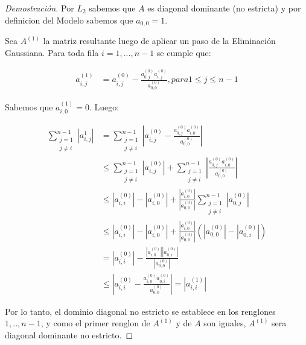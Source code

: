 \begin{proof}[Demostración]

Por $L_{2}$ sabemos que $A$ es diagonal dominante (no estricta) y por definicion del Modelo sabemos que $a_{0,0} = 1$.

Sea $A^{(1)}$ la matriz resultante luego de aplicar un paso de la Eliminación Gaussiana. Para toda fila $i = 1,...,n-1$ se cumple que:

\begin{equation*}
    \begin{aligned}
      a^{(1)}_{i,j} &= a^{(0)}_{i,j} - \frac{a^{(0)}_{0,j}a^{(0)}_{i,j}}{a^{(0)}_{0,0}}, para 1 \leq j \leq n-1
    \end{aligned}
\end{equation*}

Sabemos que $a^{(1)}_{i,0} = 0$. Luego:

\begin{equation*}
    \begin{aligned}
      \sum\limits_{\substack{j=1  \\ j \neq i}}^{n-1} |a^{1}_{i,j}| &= \sum\limits_{\substack{j=1  \\ j \neq i}}^{n-1} |a^{(0)}_{i,j} - \frac{a^{(0)}_{0,j}a^{(0)}_{i,0}}{a^{(0)}_{0,0}}| \\
      &\leq \sum\limits_{\substack{j=1  \\ j \neq i}}^{n-1} |a^{(0)}_{i,j}| + \sum\limits_{\substack{j=1  \\ j \neq i}}^{n-1} |\frac{a^{(0)}_{0,j}a^{(0)}_{i,0}}{a^{(0)}_{0,0}}| \\
      &\leq |a^{(0)}_{i,i}| - |a^{(0)}_{i,0}| +  \frac{|a^{(0)}_{i,0}|}{|a^{(0)}_{0,0}|} \sum\limits_{\substack{j=1  \\ j \neq i}}^{n-1} |a^{(0)}_{0,j}| \\
      &\leq |a^{(0)}_{i,i}| - |a^{(0)}_{i,0}| +  \frac{|a^{(0)}_{i,0}|}{|a^{(0)}_{0,0}|} (|a^{(0)}_{0,0}| - |a^{(0)}_{0,i}|) \\
      &= |a^{(0)}_{i,i}| - \frac{|a^{(0)}_{i,0}||a^{(0)}_{0,i}|}{|a^{(0)}_{0,0}|} \\
      &\leq |a^{(0)}_{i,i} - \frac{a^{(0)}_{i,0}a^{(0)}_{0,i}}{a^{(0)}_{0,0}}| = |a^{(1)}_{i,i}|
    \end{aligned}
\end{equation*}

Por lo tanto, el dominio diagonal no estricto se establece en los renglones $1,..,n-1$, y como el primer renglon de $A^{(1)}$ y de $A$ son iguales,
$A^{(1)}$ sera diagonal dominante no estricto.


\end{proof}
